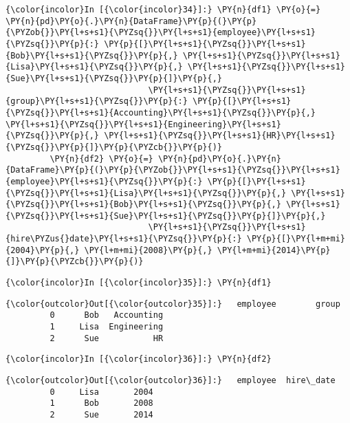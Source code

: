     \begin{Verbatim}[commandchars=\\\{\}]
{\color{incolor}In [{\color{incolor}34}]:} \PY{n}{df1} \PY{o}{=} \PY{n}{pd}\PY{o}{.}\PY{n}{DataFrame}\PY{p}{(}\PY{p}{\PYZob{}}\PY{l+s+s1}{\PYZsq{}}\PY{l+s+s1}{employee}\PY{l+s+s1}{\PYZsq{}}\PY{p}{:} \PY{p}{[}\PY{l+s+s1}{\PYZsq{}}\PY{l+s+s1}{Bob}\PY{l+s+s1}{\PYZsq{}}\PY{p}{,} \PY{l+s+s1}{\PYZsq{}}\PY{l+s+s1}{Lisa}\PY{l+s+s1}{\PYZsq{}}\PY{p}{,} \PY{l+s+s1}{\PYZsq{}}\PY{l+s+s1}{Sue}\PY{l+s+s1}{\PYZsq{}}\PY{p}{]}\PY{p}{,}
                             \PY{l+s+s1}{\PYZsq{}}\PY{l+s+s1}{group}\PY{l+s+s1}{\PYZsq{}}\PY{p}{:} \PY{p}{[}\PY{l+s+s1}{\PYZsq{}}\PY{l+s+s1}{Accounting}\PY{l+s+s1}{\PYZsq{}}\PY{p}{,} \PY{l+s+s1}{\PYZsq{}}\PY{l+s+s1}{Engineering}\PY{l+s+s1}{\PYZsq{}}\PY{p}{,} \PY{l+s+s1}{\PYZsq{}}\PY{l+s+s1}{HR}\PY{l+s+s1}{\PYZsq{}}\PY{p}{]}\PY{p}{\PYZcb{}}\PY{p}{)}
         \PY{n}{df2} \PY{o}{=} \PY{n}{pd}\PY{o}{.}\PY{n}{DataFrame}\PY{p}{(}\PY{p}{\PYZob{}}\PY{l+s+s1}{\PYZsq{}}\PY{l+s+s1}{employee}\PY{l+s+s1}{\PYZsq{}}\PY{p}{:} \PY{p}{[}\PY{l+s+s1}{\PYZsq{}}\PY{l+s+s1}{Lisa}\PY{l+s+s1}{\PYZsq{}}\PY{p}{,} \PY{l+s+s1}{\PYZsq{}}\PY{l+s+s1}{Bob}\PY{l+s+s1}{\PYZsq{}}\PY{p}{,} \PY{l+s+s1}{\PYZsq{}}\PY{l+s+s1}{Sue}\PY{l+s+s1}{\PYZsq{}}\PY{p}{]}\PY{p}{,}
                             \PY{l+s+s1}{\PYZsq{}}\PY{l+s+s1}{hire\PYZus{}date}\PY{l+s+s1}{\PYZsq{}}\PY{p}{:} \PY{p}{[}\PY{l+m+mi}{2004}\PY{p}{,} \PY{l+m+mi}{2008}\PY{p}{,} \PY{l+m+mi}{2014}\PY{p}{]}\PY{p}{\PYZcb{}}\PY{p}{)}
\end{Verbatim}


    \begin{Verbatim}[commandchars=\\\{\}]
{\color{incolor}In [{\color{incolor}35}]:} \PY{n}{df1}
\end{Verbatim}


\begin{Verbatim}[commandchars=\\\{\}]
{\color{outcolor}Out[{\color{outcolor}35}]:}   employee        group
         0      Bob   Accounting
         1     Lisa  Engineering
         2      Sue           HR
\end{Verbatim}
            
    \begin{Verbatim}[commandchars=\\\{\}]
{\color{incolor}In [{\color{incolor}36}]:} \PY{n}{df2}
\end{Verbatim}


\begin{Verbatim}[commandchars=\\\{\}]
{\color{outcolor}Out[{\color{outcolor}36}]:}   employee  hire\_date
         0     Lisa       2004
         1      Bob       2008
         2      Sue       2014
\end{Verbatim}
            
